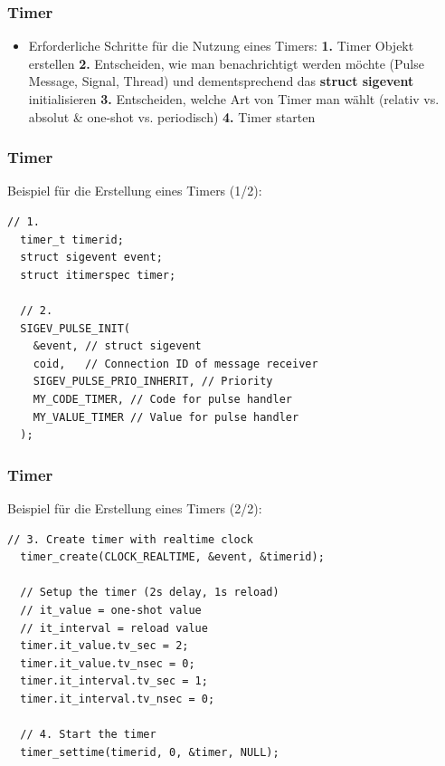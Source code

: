 \documentclass{beamer}
\begin{document}
\begin{frame}[fragile]
 \frametitle{Timer}
 \begin{itemize}
  \item Erforderliche Schritte f\"ur die Nutzung eines Timers:\newline\newline
  \textbf{1.} Timer Objekt erstellen\newline\newline
  \textbf{2.} Entscheiden, wie man benachrichtigt werden m\"ochte (Pulse Message, Signal, Thread) und dementsprechend das \textbf{struct sigevent} initialisieren\newline\newline
  \textbf{3.} Entscheiden, welche Art von Timer man w\"ahlt (relativ vs. absolut \& one-shot vs. periodisch)\newline\newline
  \textbf{4.} Timer starten
 \end{itemize}
\end{frame}

\begin{frame}[fragile]
 \frametitle{Timer}
 Beispiel f\"ur die Erstellung eines Timers (1/2):
 \begin{lstlisting}[frame=single]
  // 1.
  timer_t timerid;
  struct sigevent event;
  struct itimerspec timer;

  // 2.
  SIGEV_PULSE_INIT(
    &event, // struct sigevent
    coid,   // Connection ID of message receiver
    SIGEV_PULSE_PRIO_INHERIT, // Priority
    MY_CODE_TIMER, // Code for pulse handler
    MY_VALUE_TIMER // Value for pulse handler
  );
 \end{lstlisting}
\end{frame}

\begin{frame}[fragile]
 \frametitle{Timer}
 Beispiel f\"ur die Erstellung eines Timers (2/2):
 \begin{lstlisting}[frame=single]
  // 3. Create timer with realtime clock
  timer_create(CLOCK_REALTIME, &event, &timerid);

  // Setup the timer (2s delay, 1s reload)
  // it_value = one-shot value
  // it_interval = reload value
  timer.it_value.tv_sec = 2;
  timer.it_value.tv_nsec = 0;
  timer.it_interval.tv_sec = 1;
  timer.it_interval.tv_nsec = 0;

  // 4. Start the timer
  timer_settime(timerid, 0, &timer, NULL);
 \end{lstlisting}
\end{frame}
\end{document}
